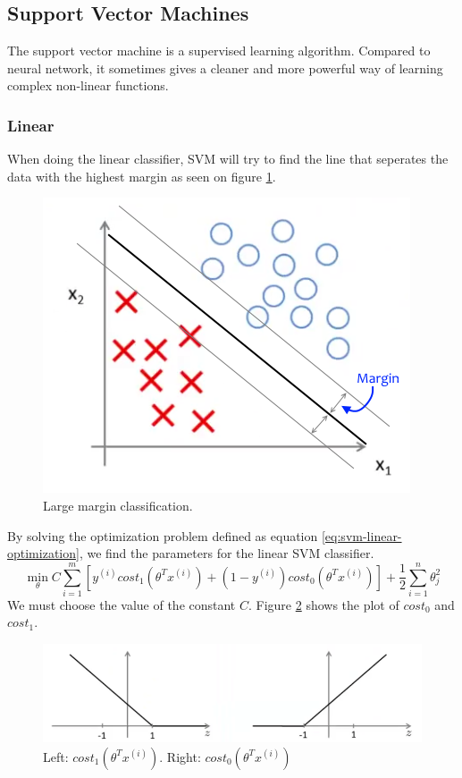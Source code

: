 
\subsection{Support Vector Machines}
The support vector machine is a supervised learning algorithm.
Compared to neural network, it sometimes gives a cleaner and more powerful way of learning complex non-linear functions. 

\subsubsection{Linear}
When doing the linear classifier, SVM will try to find the line that seperates the data with the highest margin as seen on figure \ref{fig:svm-margin}.

\begin{figure}[H]
\centering
\includegraphics[scale=.75]{billeder/svm-margin}
\caption{Large margin classification.}
\label{fig:svm-margin}
\end{figure}

By solving the optimization problem defined as equation \ref{eq:svm-linear-optimization}, we find the parameters for the linear SVM classifier.
\begin{equation}
\min_{\theta}C \sum_{i=1}^{m}
\left[ y^{(i)}cost_1(\theta^Tx^{(i)})+(1-y^{(i)})cost_0(\theta^Tx^{(i)}) \right]
+ \frac{1}{2}\sum_{i=1}^{n}\theta^2_j
\label{eq:svm-linear-optimization}
\end{equation}
We must choose the value of the constant $C$. 
Figure \ref{fig:svm-cost-function} shows the plot of $cost_0$ and $cost_1$.
\begin{figure}[H]
\centering
\includegraphics[scale=.75]{billeder/svm-cost-function}
\caption{Left: $cost_1(\theta^Tx^{(i)})$. Right: $cost_0(\theta^Tx^{(i)})$}
\label{fig:svm-cost-function}
\end{figure}

